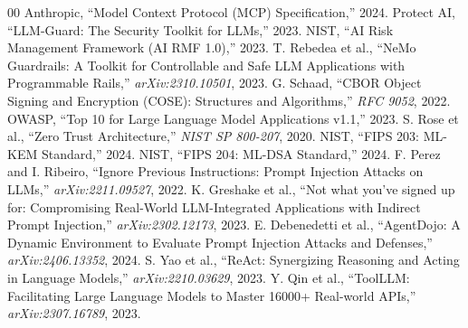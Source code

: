 \documentclass[conference]{IEEEtran}
\begin{document}

\begin{thebibliography}{00}
 Anthropic, ``Model Context Protocol (MCP) Specification,'' 2024.
 Protect AI, ``LLM-Guard: The Security Toolkit for LLMs,'' 2023.
 NIST, ``AI Risk Management Framework (AI RMF 1.0),'' 2023.
 T. Rebedea et al., ``NeMo Guardrails: A Toolkit for Controllable and Safe LLM Applications with Programmable Rails,'' \textit{arXiv:2310.10501}, 2023.
 G. Schaad, ``CBOR Object Signing and Encryption (COSE): Structures and Algorithms,'' \textit{RFC 9052}, 2022.
 OWASP, ``Top 10 for Large Language Model Applications v1.1,'' 2023.
 S. Rose et al., ``Zero Trust Architecture,'' \textit{NIST SP 800-207}, 2020.
 NIST, ``FIPS 203: ML-KEM Standard,'' 2024.
 NIST, ``FIPS 204: ML-DSA Standard,'' 2024.
 F. Perez and I. Ribeiro, ``Ignore Previous Instructions: Prompt Injection Attacks on LLMs,'' \textit{arXiv:2211.09527}, 2022.
 K. Greshake et al., ``Not what you've signed up for: Compromising Real-World LLM-Integrated Applications with Indirect Prompt Injection,'' \textit{arXiv:2302.12173}, 2023.
 E. Debenedetti et al., ``AgentDojo: A Dynamic Environment to Evaluate Prompt Injection Attacks and Defenses,'' \textit{arXiv:2406.13352}, 2024.
 S. Yao et al., ``ReAct: Synergizing Reasoning and Acting in Language Models,'' \textit{arXiv:2210.03629}, 2023.
 Y. Qin et al., ``ToolLLM: Facilitating Large Language Models to Master 16000+ Real-world APIs,'' \textit{arXiv:2307.16789}, 2023.
\end{thebibliography}
\end{document}
